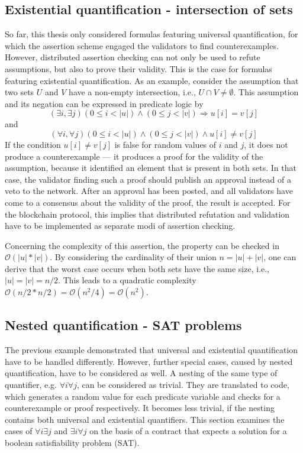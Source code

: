 \subsection{Existential quantification - intersection of sets}\label{sec:existential}
So far, this thesis only considered formulas featuring universal quantification, for which the assertion scheme engaged the validators to find counterexamples. However, distributed assertion checking can not only be used to refute assumptions, but also to prove their validity. This is the case for formulas featuring existential quantification. As an example, consider the assumption that two sets $U$ and $V$ have a non-empty intersection, i.e., $U \cap V \neq \emptyset$. This assumption and its negation can be expressed in predicate logic by 
\begin{equation}\label{eq:intersect}
  (\exists i, \exists j) (0 \le i < |u|) \land (0 \le j < |v|) \Rightarrow u[i] = v[j]
\end{equation}
and
\begin{equation}\label{eq:intersect_neg}
  (\forall i, \forall j) (0 \le i < |u|) \land (0 \le j < |v|) \land u[i] \neq v[j]
\end{equation}
If the condition $u[i] \neq v[j]$ is false for random values of $i$ and $j$, it does not produce a counterexample --- it produces a proof for the validity of the assumption, because it identified an element that is present in both sets. In that case, the validator finding such a proof should publish an approval instead of a veto to the network. After an approval has been posted, and all validators have come to a consensus about the validity of the proof, the result is accepted. For the blockchain protocol, this implies that distributed refutation and validation have to be implemented as separate modi of assertion checking.

Concerning the complexity of this assertion, the property can be checked in $\mathcal{O}(|u|*|v|)$. By considering the cardinality of their union $n = |u|+|v|$, one can derive that the worst case occurs when both sets have the same size, i.e., $|u| = |v| = n/2$. This leads to a quadratic complexity $\mathcal{O}(n/2 * n/2) = \mathcal{O}(n^2/4) = \mathcal{O}(n^2)$.

\subsection{Nested quantification - SAT problems}
The previous example demonstrated that universal and existential quantification have to be handled differently. However, further special cases, caused by nested quantification, have to be considered as well. A nesting of the same type of quantifier, e.g. $\forall i \forall j$, can be considered as trivial. They are translated to code, which generates a random value for each predicate variable and checks for a counterexample or proof respectively. It becomes less trivial, if the nesting contains both universal and existential quantifiers. This section examines the cases of $\forall i \exists j$ and $\exists i \forall j$ on the basis of a contract that expects a solution for a boolean satisfiability problem (SAT).

